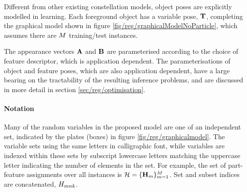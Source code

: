 Different from other existing constellation models, object poses are explicitly modelled in learning. Each foreground object has a variable pose, $\mathbf{T}$, completing the graphical model shown in figure \ref{fig/reg/graphicalModelNoParticle}, which assumes there are $M$ training/test instances. 

The appearance vectors $\mathbf{A}$ and $\mathbf{B}$ are parameterised according to the choice of feature descriptor, which is application dependent. The parameterisations of object and feature poses, which are also application dependent, have a large bearing on the tractability of the resulting inference problems, and are discussed in more detail in section \ref{sec/reg/optimisation}. 


\paragraph{Notation~} Many of the random variables in the proposed model are one of an independent set, indicated by the plates (boxes) in figure \ref{fig/reg/graphicalmodel}. The variable sets using the same letters in calligraphic font, while variables are indexed within these sets by subscript lowercase letters matching the uppercase letter indicating the number of elements in the set. For example, the set of part-feature assignments over all instances is $\mathcal{H} = \{\mathbf{H}_{m}\}_{m=1}^M$. Set and subset indices are concatenated, \eg ${H}_{mnk}$.

